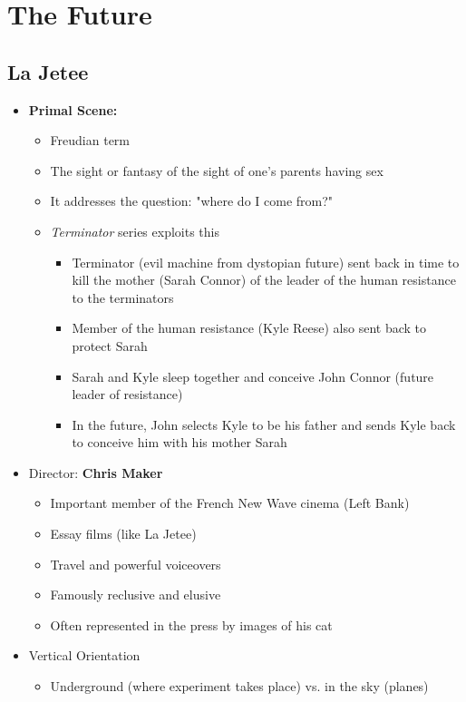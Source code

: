 \documentclass[11pt,fleqn]{book} %
\begin{document}
\section{The Future}
\subsection{La Jetee}
\begin{itemize}
    \item \textbf{Primal Scene:}
    \begin{itemize}
        \item Freudian term
        \item The sight or fantasy of the sight of one's parents having sex
        \item It addresses the question: "where do I come from?"
        \item \textit{Terminator} series exploits this
        \begin{itemize}
            \item Terminator (evil machine from dystopian future) sent back in time to kill
the mother (Sarah Connor) of the leader of the human resistance to the
terminators
            \item Member of the human resistance (Kyle Reese) also sent back to protect
Sarah
            \item  Sarah and Kyle sleep together and conceive John Connor (future leader of
resistance)
            \item  In the future, John selects Kyle to be his father and sends Kyle back to
conceive him with his mother Sarah
        \end{itemize}
    \end{itemize}
    \item Director: \textbf{Chris Maker}
    \begin{itemize}
        \item Important member of the French New Wave cinema (Left Bank)
        \item Essay films (like La Jetee)
        \item Travel and powerful voiceovers
        \item Famously reclusive and elusive
        \item Often represented in the press by images of his cat
    \end{itemize}
    \item Vertical Orientation
    \begin{itemize}
        \item Underground (where experiment takes place) vs. in the sky (planes)

\end{itemize}
\end{itemize}
\end{document}
